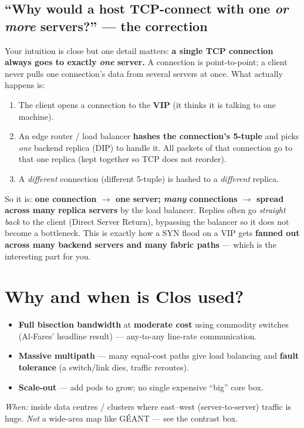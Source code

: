 \documentclass[11pt]{article}
\begin{document}
\subsection*{``Why would a host TCP-connect with one \emph{or more} servers?'' --- the correction}
Your intuition is close but one detail matters: \textbf{a single TCP connection always goes to exactly
\emph{one} server.} A connection is point-to-point; a client never pulls one connection's data from several
servers at once. What actually happens is:
\begin{enumerate}[leftmargin=1.6em]
  \item The client opens a connection to the \textbf{VIP} (it thinks it is talking to one machine).
  \item An edge router / load balancer \textbf{hashes the connection's 5-tuple} and picks \emph{one}
  backend replica (DIP) to handle it. All packets of that connection go to that one replica (kept together
  so TCP does not reorder).
  \item A \emph{different} connection (different 5-tuple) is hashed to a \emph{different} replica.
\end{enumerate}
So it is: \textbf{one connection $\to$ one server; \emph{many} connections $\to$ spread across many replica
servers} by the load balancer. Replies often go \emph{straight back} to the client (Direct Server Return),
bypassing the balancer so it does not become a bottleneck. This is exactly how a SYN flood on a VIP gets
\textbf{fanned out across many backend servers and many fabric paths} --- which is the interesting part for you.

\section{Why and when is Clos used?}
\begin{itemize}[leftmargin=1.4em]
  \item \textbf{Full bisection bandwidth} at \textbf{moderate cost} using commodity switches (Al-Fares'
  headline result) --- any-to-any line-rate communication.
  \item \textbf{Massive multipath} --- many equal-cost paths give load balancing and \textbf{fault
  tolerance} (a switch/link dies, traffic reroutes).
  \item \textbf{Scale-out} --- add pods to grow; no single expensive ``big'' core box.
\end{itemize}
\emph{When:} inside data centres / clusters where east--west (server-to-server) traffic is huge. \emph{Not}
a wide-area map like GÉANT --- see the contrast box.
\end{document}
